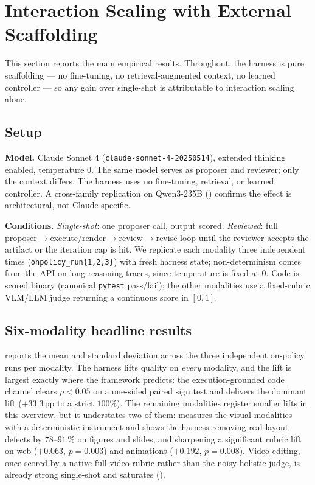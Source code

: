 \documentclass[11pt]{article}
\begin{document}
\section{Interaction Scaling with External Scaffolding}
\label{sec:harness}

This section reports the main empirical results. Throughout, the harness is pure scaffolding --- no fine-tuning, no retrieval-augmented context, no learned controller --- so any gain over single-shot is attributable to interaction scaling alone.

\subsection{Setup}
\label{sec:harness-setup}

\textbf{Model.} Claude Sonnet 4 (\texttt{claude-sonnet-4-20250514}), extended thinking enabled, temperature 0. The same model serves as proposer and reviewer; only the context differs. The harness uses no fine-tuning, retrieval, or learned controller. A cross-family replication on Qwen3-235B () confirms the effect is architectural, not Claude-specific.

\textbf{Conditions.} \emph{Single-shot}: one proposer call, output scored. \emph{Reviewed}: full proposer$\to$execute/render$\to$review$\to$revise loop until the reviewer accepts the artifact or the iteration cap is hit. We replicate each modality three independent times (\texttt{onpolicy\_run\{1,2,3\}}) with fresh harness state; non-determinism comes from the API on long reasoning traces, since temperature is fixed at 0. Code is scored binary (canonical \texttt{pytest} pass/fail); the other modalities use a fixed-rubric VLM/LLM judge returning a continuous score in $[0,1]$.

\subsection{Six-modality headline results}
\label{sec:harness-headline}

 reports the mean and standard deviation across the three independent on-policy runs per modality. The harness lifts quality on \emph{every} modality, and the lift is largest exactly where the framework predicts: the execution-grounded code channel clears $p < 0.05$ on a one-sided paired sign test and delivers the dominant lift ($+33.3$\,pp to a strict $100\%$). The remaining modalities register smaller lifts in this overview, but it understates two of them:  measures the visual modalities with a deterministic instrument and shows the harness removing real layout defects by $78$--$91\,\%$ on figures and slides, and sharpening a significant rubric lift on web ($+0.063$, $p{=}0.003$) and animations ($+0.192$, $p{=}0.008$). Video editing, once scored by a native full-video rubric rather than the noisy holistic judge, is already strong single-shot and saturates ().
\end{document}

